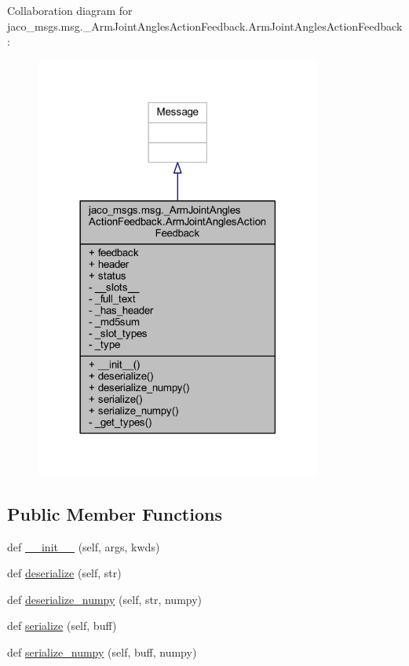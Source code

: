 Collaboration diagram for jaco\+\_\+msgs.\+msg.\+\_\+\+Arm\+Joint\+Angles\+Action\+Feedback.\+Arm\+Joint\+Angles\+Action\+Feedback\+:
\nopagebreak
\begin{figure}[H]
\begin{center}
\leavevmode
\includegraphics[width=266pt]{d3/d1e/classjaco__msgs_1_1msg_1_1__ArmJointAnglesActionFeedback_1_1ArmJointAnglesActionFeedback__coll__graph}
\end{center}
\end{figure}
\subsection*{Public Member Functions}
\begin{DoxyCompactItemize}
\item 
def \hyperlink{classjaco__msgs_1_1msg_1_1__ArmJointAnglesActionFeedback_1_1ArmJointAnglesActionFeedback_a05806978c992a60888aff82d536195d4}{\+\_\+\+\_\+init\+\_\+\+\_\+} (self, args, kwds)
\item 
def \hyperlink{classjaco__msgs_1_1msg_1_1__ArmJointAnglesActionFeedback_1_1ArmJointAnglesActionFeedback_afc2ada714b8f020c3588b9e5ad89b929}{deserialize} (self, str)
\item 
def \hyperlink{classjaco__msgs_1_1msg_1_1__ArmJointAnglesActionFeedback_1_1ArmJointAnglesActionFeedback_a15183e6b73cdfba19a26e82de0dd7da0}{deserialize\+\_\+numpy} (self, str, numpy)
\item 
def \hyperlink{classjaco__msgs_1_1msg_1_1__ArmJointAnglesActionFeedback_1_1ArmJointAnglesActionFeedback_aa748013b42d9be462707d95f59a65db5}{serialize} (self, buff)
\item 
def \hyperlink{classjaco__msgs_1_1msg_1_1__ArmJointAnglesActionFeedback_1_1ArmJointAnglesActionFeedback_a9f1895b09a3a4c9f3b31be77db0b1b6e}{serialize\+\_\+numpy} (self, buff, numpy)
\end{DoxyCompactItemize}
